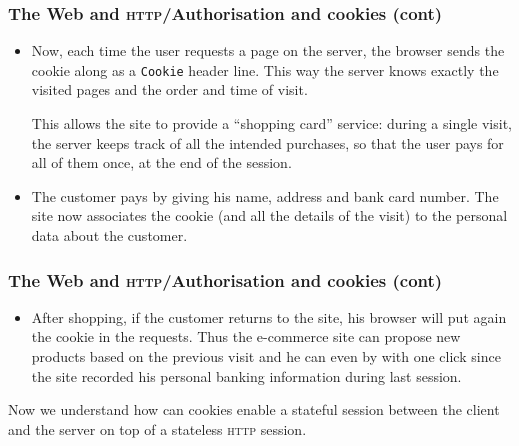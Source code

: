 %
\begin{frame}[containsverbatim]
\frametitle{The Web and \textsc{http}/Authorisation and cookies (cont)}

\begin{itemize}

  \item Now, each time the user requests a page on the server, the
    browser sends the cookie along as a \verb+Cookie+ header
    line. This way the server knows exactly the visited pages and the
    order and time of visit.

    This allows the site to provide a ``shopping card'' service:
    during a single visit, the server keeps track of all the intended
    purchases, so that the user pays for all of them once, at the end
    of the session.

  \item The customer pays by giving his name, address and bank card
    number. The site now associates the cookie (and all the details of
    the visit) to the personal data about the customer.

\end{itemize}

\end{frame}

%
\begin{frame}[containsverbatim]
\frametitle{The Web and \textsc{http}/Authorisation and cookies (cont)}

\begin{itemize}

  \item After shopping, if the customer returns to the site, his browser
    will put again the cookie in the requests. Thus the e-commerce
    site can propose new products based on the previous visit and he
    can even by with one click since the site recorded his personal
    banking information during last session.

\end{itemize}
Now we understand how can cookies enable a stateful session between
the client and the server on top of a stateless \textsc{http}
session.

\end{frame}

